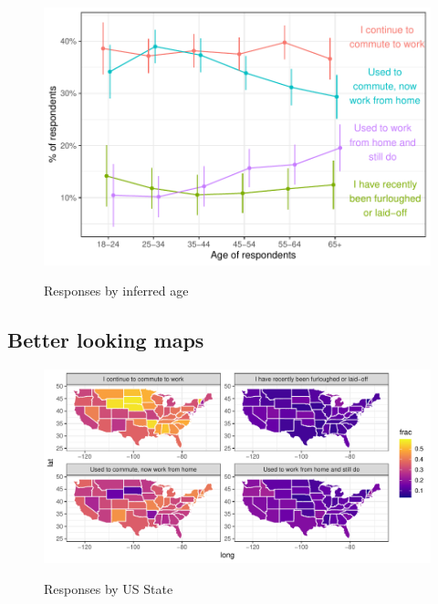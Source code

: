 \documentclass[12pt]{article}
\begin{document}
\begin{figure}
  \caption{Responses by inferred age} \label{fig:by_age}
\centering
\begin{minipage}{1.0 \linewidth}
  \includegraphics[width = \linewidth]{plots/by_age.pdf} \\
  \begin{footnotesize}
    \begin{singlespace}
    \end{singlespace}
    \end{footnotesize}
\end{minipage}
\end{figure} 



\subsection{Better looking maps} \label{sec:maps}

\begin{figure}
  \caption{Responses by US State} \label{fig:geo}
\centering
\begin{minipage}{1.0 \linewidth}
  \includegraphics[width = \linewidth]{plots/geo.pdf} \\
  \begin{footnotesize}
    \end{footnotesize}
\end{minipage}
\end{figure} 
\end{document}
